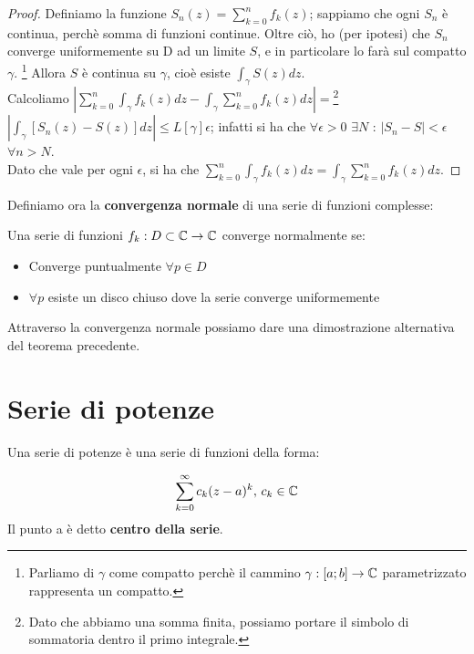 \begin{proof}
Definiamo la funzione $S_n(z)=\sum_{k=0} ^n f_k(z)$; sappiamo che ogni $S_n$ è continua, perchè somma di funzioni continue. Oltre ciò, ho (per ipotesi) che $S_n$ converge uniformemente su D ad un limite $S$, e in particolare lo farà sul compatto $\gamma$. \footnote{Parliamo di $\gamma$ come compatto perchè il cammino $\gamma:[a;b] \to \mathbb{C}$ parametrizzato rappresenta un compatto.} Allora $S$ è continua su $\gamma$, cioè esiste $\int_{\gamma} S(z) dz
$. \\Calcoliamo $\left|\sum_{k=0} ^n \int_{\gamma} f_k(z)dz - \int_{\gamma} \sum_{k=0} ^n f_k(z)dz \right| =$\footnote{Dato che abbiamo una somma finita, possiamo portare il simbolo di sommatoria dentro il primo integrale.}$\left|\int_{\gamma} [S_n(z)-S(z)]dz \right| \leq L[\gamma] \epsilon$; infatti si ha che $\forall \epsilon >0$ $\exists N$ : $|S_n-S|<\epsilon$ $\forall n>N$. \\Dato che vale per ogni $\epsilon$, si ha che $\sum_{k=0} ^n \int_{\gamma} f_k(z)dz=\int_{\gamma} \sum_{k=0} ^n f_k(z)dz$.

\end{proof}
Definiamo ora la \textbf{convergenza normale} di una serie di funzioni complesse:
\begin{definizione}
Una serie di funzioni $f_k:D \subset \mathbb{C} \to \mathbb{C}$ converge normalmente se:
\begin{itemize}
\item Converge puntualmente $\forall p \in D$
\item $\forall p$ esiste un disco chiuso dove la serie converge uniformemente
\end{itemize}
\end{definizione}
Attraverso la convergenza normale possiamo dare una dimostrazione alternativa del teorema precedente.

\section{Serie di potenze}

Una serie di potenze è una serie di funzioni della forma:

\begin{equation}
\sum_{k=0} ^{\infty} c_k (z-a)^k, \, c_k \in \mathbb{C}
\end{equation}
Il punto a è detto \textbf{centro della serie}.

